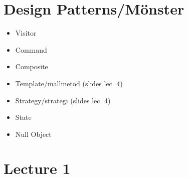 \documentclass[11pt]{amsart}
\begin{document}
\section*{Design Patterns/Mönster}

\begin{itemize}
\item Visitor
\item Command
\item Composite
\item Template/mallmetod (slides lec. 4)
\item Strategy/strategi (slides lec. 4)
\item State
\item Null Object
\end{itemize}



\section{Lecture 1}
\end{document}
